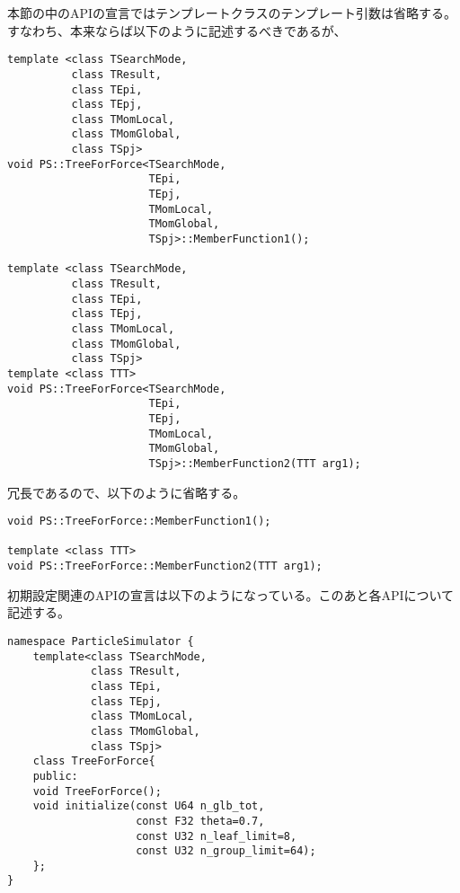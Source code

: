 本節の中のAPIの宣言ではテンプレートクラスのテンプレート引数は省略する。
すなわち、本来ならば以下のように記述するべきであるが、
\begin{screen}
\begin{verbatim}
template <class TSearchMode,
          class TResult,
          class TEpi,
          class TEpj,
          class TMomLocal,
          class TMomGlobal,
          class TSpj>
void PS::TreeForForce<TSearchMode,
                      TEpi,
                      TEpj,
                      TMomLocal,
                      TMomGlobal,
                      TSpj>::MemberFunction1();

template <class TSearchMode,
          class TResult,
          class TEpi,
          class TEpj,
          class TMomLocal,
          class TMomGlobal,
          class TSpj>
template <class TTT>
void PS::TreeForForce<TSearchMode,
                      TEpi,
                      TEpj,
                      TMomLocal,
                      TMomGlobal,
                      TSpj>::MemberFunction2(TTT arg1);
\end{verbatim}
\end{screen}
冗長であるので、以下のように省略する。
\begin{screen}
\begin{verbatim}
void PS::TreeForForce::MemberFunction1();

template <class TTT>
void PS::TreeForForce::MemberFunction2(TTT arg1);
\end{verbatim}
\end{screen}

\label{sec:treeForForceInitializeAPI}

初期設定関連のAPIの宣言は以下のようになっている。このあと各APIについて
記述する。
\begin{lstlisting}[caption=TreeForForce1]
namespace ParticleSimulator {
    template<class TSearchMode,
             class TResult,
             class TEpi,
             class TEpj,
             class TMomLocal,
             class TMomGlobal,
             class TSpj>
    class TreeForForce{
    public:
    void TreeForForce();
    void initialize(const U64 n_glb_tot,
                    const F32 theta=0.7,
                    const U32 n_leaf_limit=8,
                    const U32 n_group_limit=64);
    };
}
\end{lstlisting}


